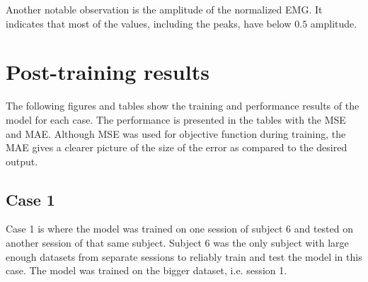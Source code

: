 \documentclass[../main.tex]{subfiles}
\begin{document}
Another notable observation is the amplitude of the normalized \ac{EMG}.
It indicates that most of the values, including the peaks, have below $0.5$ amplitude.

\section{Post-training results}
\label{sec:post-training-results}
The following figures and tables show the training and performance results of the model for each case.
The performance is presented in the tables with the \ac{MSE} and \ac{MAE}.
Although \ac{MSE} was used for objective function during training, the \ac{MAE} gives a clearer picture of the size of the error as compared to the desired output.

\subsection{Case 1}
\label{sec:results-case1}
Case 1 is where the model was trained on one session of subject 6 and tested on another session of that same subject.
Subject 6 was the only subject with large enough datasets from separate sessions to reliably train and test the model in this case.
The model was trained on the bigger dataset, i.e. session 1.
\end{document}
